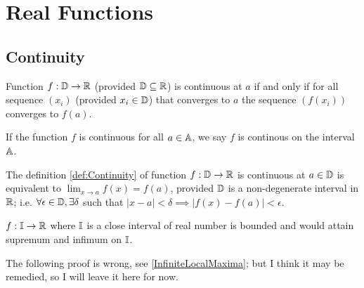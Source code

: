 \documentclass[../note.tex]{subfiles}
\begin{document}
\section{Real Functions}

\subsection{Continuity}

\begin{definition}\label{def:Continuity}
	Function $f: \mathbb{D} \rightarrow \mathbb{R}$ (provided $\mathbb{D} \subseteq \mathbb{R}$) is continuous at $a$
	if and only if for all sequence $(x_i)$ (provided $x_i \in \mathbb{D}$) that converges to $a$ the sequence $(f(x_i))$ converges to $f(a)$.

	If the function $f$ is continuous for all $a \in \mathbb{A}$, we say $f$ is continous on the interval $\mathbb{A}$.
\end{definition}

\begin{theorem}
	The definition \ref{def:Continuity} of function $f:\mathbb{D} \rightarrow \mathbb{R}$ is continuous at $a\in \mathbb{D}$ is equivalent to $\lim _{x\to a}f(x) = f(a)$, provided $\mathbb{D}$ is a non-degenerate interval in $\mathbb{R}$; 
	i.e. $\forall \epsilon \in \mathbb{D}, \exists \delta $ such that $|x-a| < \delta \implies |f(x)-f(a)| < \epsilon$.
\end{theorem}

\begin{definition}
	$f:\mathbb{I} \rightarrow \mathbb{R}$ where $\mathbb{I}$ is a close interval of real number is bounded and would attain supremum and infimum on $\mathbb{I}$.
\end{definition}

The following proof is wrong, see \ref{InfiniteLocalMaxima}; but I think it may be remedied, so I will leave it here for now.
\end{document}
